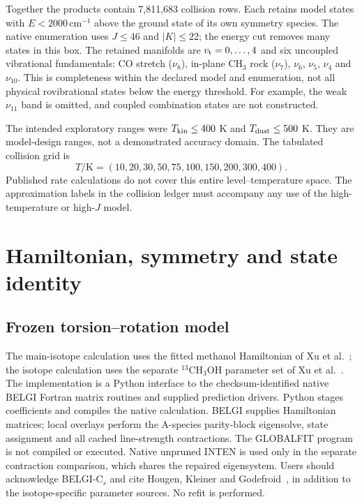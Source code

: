 \documentclass[11pt,a4paper]{article}
\newcommand{\vt}{v_{\rm t}}
\newcommand{\cm}{\,\mathrm{cm}^{-1}}
\begin{document}
Together the products contain 7,811,683 collision rows. Each retains model
states with $E<2000\cm$ above the ground state of its own symmetry species.
The native enumeration uses $J\le46$ and $|K|\le22$; the energy cut removes
many states in this box. The retained manifolds are $\vt=0,\ldots,4$ and six
uncoupled vibrational fundamentals: CO stretch ($\nu_8$), in-plane CH$_3$
rock ($\nu_7$), $\nu_6$, $\nu_5$, $\nu_4$ and $\nu_{10}$.
This is completeness within the declared model and enumeration, not all
physical rovibrational states below the energy threshold. For example, the
weak $\nu_{11}$ band is omitted, and coupled combination states are not
constructed.

The intended exploratory ranges were $T_{\rm kin}\le400$ K and
$T_{\rm dust}\le500$ K. They are model-design ranges, not a demonstrated
accuracy domain. The tabulated collision grid is
\begin{equation}
T/\mathrm K=(10,20,30,50,75,100,150,200,300,400).
\end{equation}
Published rate calculations do not cover this entire level--temperature space.
The approximation labels in the collision ledger must accompany any use of
the high-temperature or high-$J$ model.

\section{Hamiltonian, symmetry and state identity}
\subsection{Frozen torsion--rotation model}
The main-isotope calculation uses the fitted methanol Hamiltonian of
Xu et al.~\cite{XuEtAl2008}; the isotope calculation uses the separate
$^{13}$CH$_3$OH parameter set of Xu et al.~\cite{XuEtAl2014C13}.
The implementation is a Python interface to the checksum-identified native
BELGI Fortran matrix routines and supplied prediction drivers. Python stages
coefficients and compiles the native calculation. BELGI supplies Hamiltonian
matrices; local overlays perform the A-species parity-block eigensolve, state
assignment and all cached line-strength contractions. The GLOBALFIT program
is not compiled or executed. Native unpruned INTEN is used only in the separate
contraction comparison, which shares the repaired eigensystem. Users should acknowledge BELGI-C$_s$ and cite
Hougen, Kleiner and Godefroid~\cite{Hougen_1994}, in addition to the
isotope-specific parameter sources. No refit is performed.
\end{document}
